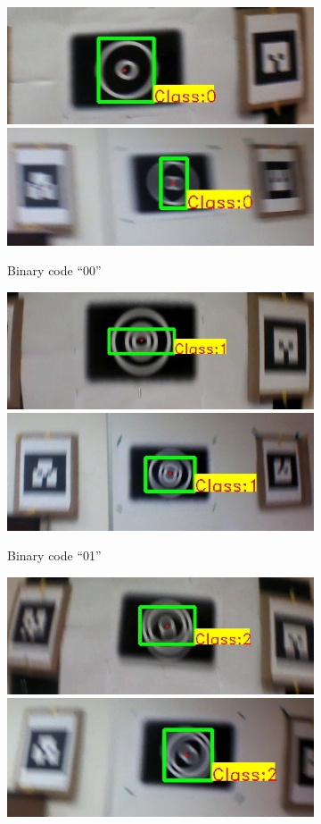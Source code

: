 \documentclass[runningheads]{llncs}
\begin{document}
\begin{figure}[hb!]
\begin{subfigure}{\textwidth}
\centering
  \includegraphics[width=0.48\linewidth]{output_00.jpg}
  \includegraphics[width=0.48\linewidth]{new_results/output_00.jpg}
  \caption{Binary code ``00''}
  \label{fig:output0}
\end{subfigure}
\begin{subfigure}{\textwidth}
\centering
  \includegraphics[width=0.48\linewidth]{output_01.jpg}
  \includegraphics[width=0.48\linewidth]{new_results/output_01.jpg}
  \caption{Binary code ``01''}
  \label{fig:output1}
\end{subfigure}
\begin{subfigure}{\textwidth}
\centering
  \includegraphics[width=0.48\linewidth]{output_10.jpg}
  \includegraphics[width=0.48\linewidth]{new_results/output_10.jpg}

\end{subfigure}
\end{figure}
\end{document}

